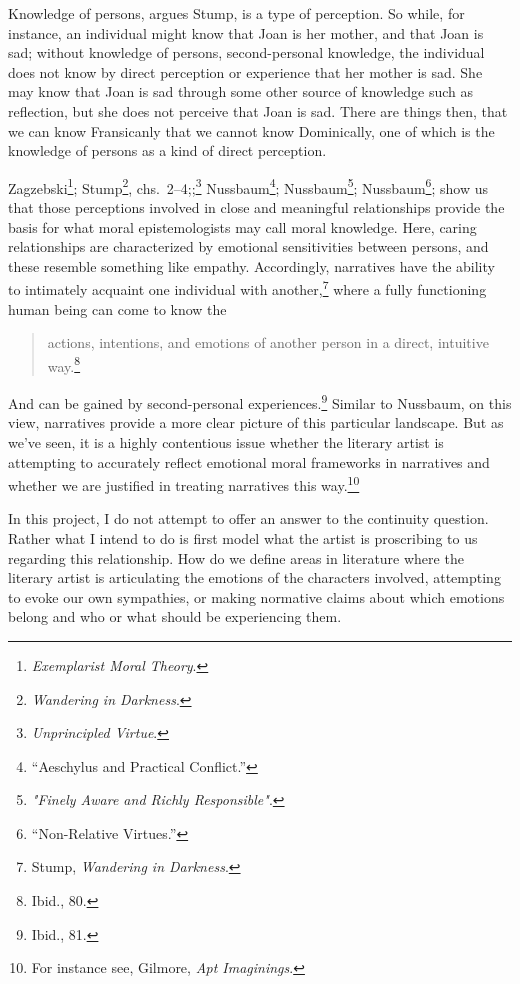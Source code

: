 \documentclass[phdthesis,12pt,final]{wuthesis}
\theoremstyle{definition}
\theoremstyle{definition}
\theoremstyle{definition}
\theoremstyle{definition}
\theoremstyle{remark}
\begin{document}
Knowledge of persons, argues Stump, is a type of perception. So while,
for instance, an individual might know that Joan is her mother, and
that Joan is sad; without knowledge of persons, second-personal knowledge, the individual does not know by direct perception or experience that her mother is sad. She may know that Joan is sad through some other source of knowledge such as reflection, but she does not perceive that Joan is sad. There are things then, that we can know Fransicanly that we cannot know Dominically, one of which is the knowledge of persons as a kind of direct perception.

Zagzebski\footnote{\emph{Exemplarist {Moral Theory}}.}; Stump\footnote{\emph{Wandering in {Darkness}}.}, chs.~2--4;;\footnote{\emph{Unprincipled {Virtue}}.} Nussbaum\footnote{{``Aeschylus and Practical Conflict.''}}; Nussbaum\footnote{\emph{"{Finely Aware} and {Richly Responsible}"}.}; Nussbaum\footnote{{``Non-Relative Virtues.''}}; show us that those perceptions involved in close and meaningful relationships provide the basis for what moral epistemologists may call moral knowledge. Here, caring relationships are characterized by emotional sensitivities between persons, and these resemble something like empathy. Accordingly, narratives have the ability to intimately acquaint one individual with another,\footnote{Stump, \emph{Wandering in {Darkness}}.} where a fully functioning human being can come to know the

\begin{quote}
actions, intentions, and emotions of another person in a direct, intuitive way.\footnote{Ibid., 80.}
\end{quote}

\noindent And can be gained by second-personal experiences.\footnote{Ibid., 81.} Similar to Nussbaum, on this view, narratives provide a more clear picture of this particular landscape. But as we've seen, it is a highly contentious issue whether the literary artist is attempting to accurately reflect emotional moral frameworks in narratives and whether we are justified in treating narratives this way.\footnote{For instance see, Gilmore, \emph{Apt {Imaginings}}.}

\noindent In this project, I do not attempt to offer an answer to the continuity question. Rather what I intend to do is first model what the artist is proscribing to us regarding this relationship. How do we define areas in literature where the literary artist is articulating the emotions of the characters involved, attempting to evoke our own sympathies, or making normative claims about which emotions belong and who or what should be experiencing them.
\end{document}
